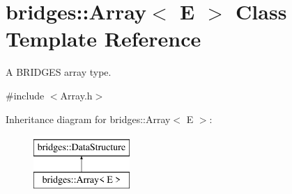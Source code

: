 \hypertarget{classbridges_1_1_array}{}\section{bridges\+:\+:Array$<$ E $>$ Class Template Reference}
\label{classbridges_1_1_array}


A B\+R\+I\+D\+G\+ES array type.  




{\ttfamily \#include $<$Array.\+h$>$}

Inheritance diagram for bridges\+:\+:Array$<$ E $>$\+:\begin{figure}[H]
\begin{center}
\leavevmode
\includegraphics[height=2.000000cm]{classbridges_1_1_array}
\end{center}
\end{figure}
